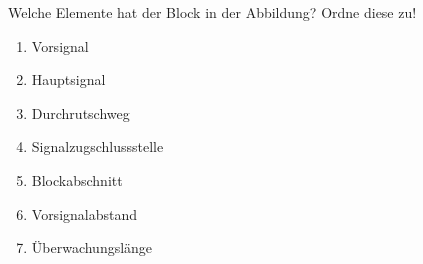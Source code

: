 


Welche Elemente hat der Block in der Abbildung? Ordne diese zu!

\begin{enumerate}
  \item Vorsignal
  \item Hauptsignal
  \item Durchrutschweg
  \item Signalzugschlussstelle
  \item Blockabschnitt
  \item Vorsignalabstand
  \item Überwachungslänge
\end{enumerate}

